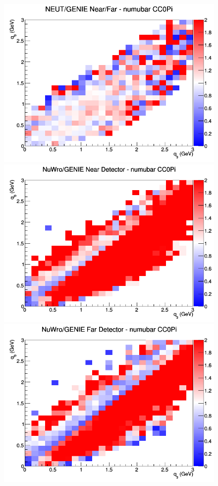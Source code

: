 \documentclass[12pt]{article}
\begin{document}
\begin{figure}[h]
\endminipage
{}
\includegraphics[width=\linewidth]{eff_q0_q3/FGT/ratios/CC0Pi_NEUT_GENIE_numubar_NF_q3_q0.png}
\endminipage
\newline
{}
\includegraphics[width=\linewidth]{eff_q0_q3/FGT/ratios/CC0Pi_NuWro_GENIE_numubar_near_q3_q0.png}
\endminipage
{}
\includegraphics[width=\linewidth]{eff_q0_q3/FGT/ratios/CC0Pi_NuWro_GENIE_numubar_far_q3_q0.png}

\end{figure}
\end{document}
